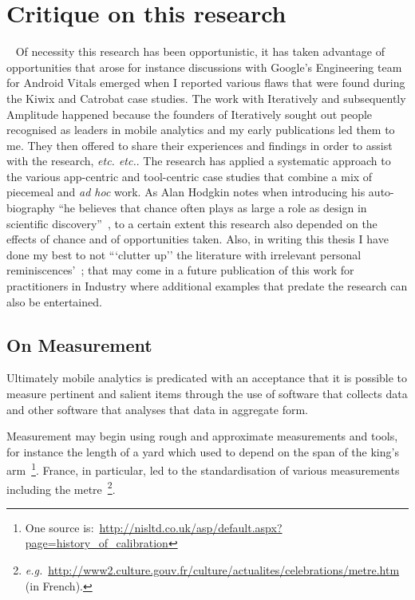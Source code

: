 \section{Critique on this research}~\label{discussion-critique-on-this-research}
Of necessity this research has been opportunistic, it has taken advantage of opportunities that arose for instance discussions with Google's Engineering team for Android Vitals emerged when I reported various flaws that were found during the Kiwix and Catrobat case studies. The work with Iteratively and subsequently Amplitude happened because the founders of Iteratively sought out people recognised as leaders in mobile analytics and my early publications led them to me. They then offered to share their experiences and findings in order to assist with the research, \emph{etc. etc.}. The research has applied a systematic approach to the various app-centric and tool-centric case studies that combine a mix of piecemeal and \emph{ad hoc} work. As Alan Hodgkin notes when introducing his auto-biography ``he believes that chance often plays as large a role as design in scientific discovery''~, to a certain extent this research also depended on the effects of chance and of opportunities taken. Also, in writing this thesis I have done my best to not ```clutter up'' the literature with irrelevant personal reminiscences'~; that may come in a future publication of this work for practitioners in Industry where additional examples that predate the research can also be entertained. 

\subsection{On Measurement}
Ultimately mobile analytics is predicated with an acceptance that it is possible to measure pertinent and salient items through the use of software that collects data and other software that analyses that data in aggregate form.

Measurement may begin using rough and approximate measurements and tools, for instance the length of a yard which used to depend on the span of the king's arm~\footnote{One source is:~\url{http://nisltd.co.uk/asp/default.aspx?page=history_of_calibration}}. France, in particular, led to the standardisation of various measurements including the metre~\footnote{\emph{e.g.}~\url{http://www2.culture.gouv.fr/culture/actualites/celebrations/metre.htm} (in French).}. 

